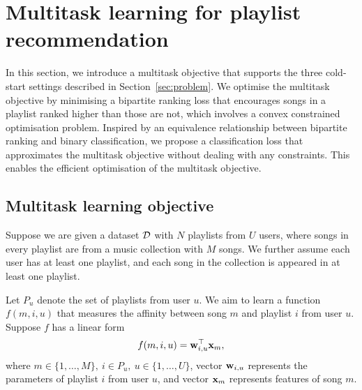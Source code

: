 \section{Multitask learning for playlist recommendation}
\label{sec:method}

In this section, we introduce a multitask objective that supports the three cold-start settings
described in Section~\ref{sec:problem}. 
We optimise the multitask objective by minimising a bipartite ranking loss that encourages songs in a playlist
ranked higher than those are not, which involves a convex constrained optimisation problem.
Inspired by an equivalence relationship between bipartite ranking and binary classification, 
we propose a classification loss that approximates the multitask objective without dealing with any constraints.
This enables the efficient optimisation of the multitask objective.



\subsection{Multitask learning objective}

Suppose we are given a dataset $\mathcal{D}$ with $N$ playlists from $U$ users, 
where songs in every playlist are from a music collection with $M$ songs.
We further assume each user has at least one playlist, and each song in the collection 
is appeared in at least one playlist.

Let $P_u$ denote the set of playlists from user $u$.
We aim to learn a function $f(m, i, u)$ that measures the affinity between song $m$ and playlist $i$ from user $u$.
Suppose $f$ has a linear form
\begin{equation}
\label{eq:scorefunc}
f(m, i, u) = \mathbf{w}_{i,u}^\top \mathbf{x}_m,
\end{equation}
where $m \in \{1,\dots,M\}, \ i \in P_u, \ u \in \{1,\dots,U\}$,
vector $\mathbf{w}_{i,u}$ represents the parameters of playlist $i$ from user $u$,
and vector $\mathbf{x}_m$ represents features of song $m$.

